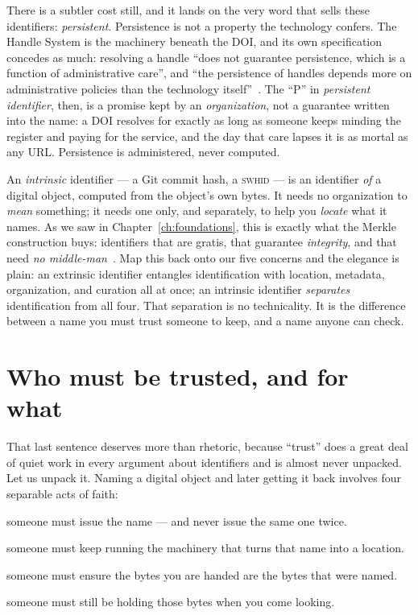 There is a subtler cost still, and it lands on the very word that sells these identifiers:
\emph{persistent}. Persistence is not a property the technology confers. The Handle System is the
machinery beneath the DOI, and its own specification concedes as much: resolving a handle
\enquote{does not guarantee persistence, which is a function of administrative care}, and
\enquote{the persistence of handles depends more on administrative policies than the technology
itself}~\autocite{RFC3650}. The \enquote{P} in \emph{persistent identifier}, then, is a promise
kept by an \emph{organization}, not a guarantee written into the name: a DOI resolves for exactly as
long as someone keeps minding the register and paying for the service, and the day that care lapses
it is as mortal as any URL. Persistence is administered, never computed.

An \emph{intrinsic} identifier --- a Git commit hash, a \textsc{swhid} --- is an identifier
\emph{of} a digital object, computed from the object's own bytes. It needs no organization to
\emph{mean} something; it needs one only, and separately, to help you \emph{locate} what it names.
As we saw in Chapter~\ref{ch:foundations}, this is exactly what the Merkle construction buys:
identifiers that are gratis, that guarantee \emph{integrity}, and that need \emph{no
middle-man}~\autocite{cise-2020-doi}. Map this back onto our five concerns and the elegance is
plain: an extrinsic identifier entangles identification with location, metadata, organization, and
curation all at once; an intrinsic identifier \emph{separates} identification from all four. That
separation is no technicality. It is the difference between a name you must trust someone to keep,
and a name anyone can check.


\section{Who must be trusted, and for what}

That last sentence deserves more than rhetoric, because \enquote{trust} does a great deal of quiet
work in every argument about identifiers and is almost never unpacked. Let us unpack it. Naming a
digital object and later getting it back involves four separable acts of faith:

\begin{description}[leftmargin=!,labelwidth=2.5cm,font=\bfseries\sffamily]
  \item[Minting] someone must issue the name --- and never issue the same one twice.
  \item[Resolution] someone must keep running the machinery that turns that name into a location.
  \item[Integrity] someone must ensure the bytes you are handed are the bytes that were named.
  \item[Availability] someone must still be holding those bytes when you come looking.
\end{description}

